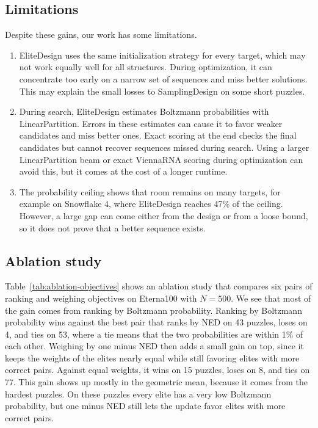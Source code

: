 \subsection{Limitations}\label{sec:limitations}
Despite these gains, our work has some limitations.
{
\begin{enumerate}
\item EliteDesign uses the same initialization strategy for every target, which may not work
  equally well for all structures. During optimization, it can concentrate too early on
  a narrow set of sequences and miss better solutions. This may explain the small losses to SamplingDesign on some short puzzles.
\item During search, EliteDesign estimates Boltzmann probabilities with LinearPartition. Errors in these estimates
  can cause it to favor weaker candidates and miss better ones.
  Exact scoring at the end checks the final candidates but cannot recover sequences
  missed during search. Using a larger LinearPartition beam or exact ViennaRNA scoring during optimization can avoid this, but it comes at the cost of a longer runtime.
\item The probability ceiling shows that room remains on many targets, for example on Snowflake 4, where EliteDesign reaches 47\% of the ceiling. However, a large gap can come either from the design or from a loose bound, so it does not prove that a better sequence exists.
\end{enumerate}\par}

\subsection{Ablation study}\label{sec:ablation}

Table~\ref{tab:ablation-objectives} shows an ablation study that compares six pairs of ranking and weighing objectives on Eterna100 with $N=500$. We see that most of the gain comes from ranking by Boltzmann probability. Ranking by Boltzmann probability wins against the best pair that ranks by NED on 43 puzzles, loses on 4, and ties on 53, where a tie means that the two probabilities are within 1\% of each other. Weighing by one minus NED then adds a small gain on top, since it keeps the weights of the elites nearly equal while still favoring elites with more correct pairs. Against equal weights, it wins on 15 puzzles, loses on 8, and ties on 77. This gain shows up mostly in the geometric mean, because it comes from the hardest puzzles. On these puzzles every elite has a very low Boltzmann probability, but one minus NED still lets the update favor elites with more correct pairs.

